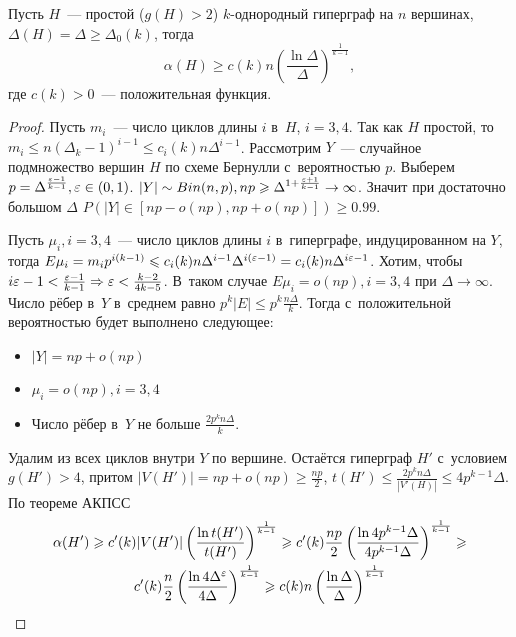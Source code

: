 \documentclass{article}
\begin{document}
\begin{theorem}
	Пусть $H$~--- простой ($g(H) > 2$) $k$-однородный гиперграф на $n$ вершинах,
	$\Delta(H) = \Delta \ge \Delta_0(k)$, тогда
	$$
		\alpha(H) \ge c(k) n\left( \frac{\ln \Delta}{\Delta} \right)^{
			\frac{1}{k-1}},
	$$
	где $c(k) > 0$~--- положительная функция.
\end{theorem}
\begin{proof}
	Пусть $m_i$~--- число циклов длины $i$ в~$H$, $i = 3, 4$. Так как $H$ простой,
	то $m_i \le n (\Delta_k-1)^{i-1} \le c_i(k) n \Delta^{i-1}$. Рассмотрим
	$Y$~--- случайное подмножество вершин $H$ по схеме Бернулли с~вероятностью
	$p$. Выберем $p = \Delta^{\frac{\varepsilon - 1}{k - 1}}, \varepsilon \in (0, 1)$. $|Y| \sim
	Bin(n, p), np \geqslant \Delta^{1+\frac{\varepsilon+1}{k-1}} \rightarrow \infty$. Значит
	при достаточно большом $\Delta$ $P\left(|Y| \in [np - o(np), np + o(np)]
	\right) \ge 0.99$.

	Пусть $\mu_i, i = 3,4$~--- число циклов длины $i$ в~гиперграфе, индуцированном
	на $Y$, тогда $E\mu_i = m_i p^{i(k-1)} \leqslant c_i(k) n \Delta^{i-1}
	\Delta^{i(\varepsilon - 1)} = c_i(k) n \Delta^{i\varepsilon - 1}$. Хотим, чтобы $i\varepsilon - 1
	< \frac{\varepsilon - 1}{k - 1} \Rightarrow \varepsilon < \frac{k-2}{4k-5}$. В~таком случае
	$E\mu_i = o(np), i=3,4$ при $\Delta \rightarrow \infty$. Число рёбер в~$Y$
	в~среднем равно $p^k|E| \le p^k \frac{n\Delta}{k}$. Тогда с~положительной
	вероятностью будет выполнено следующее:
	\begin{itemize}
		\item $|Y| = np + o(np)$
		\item $\mu_i = o(np), i=3,4$
		\item Число рёбер в~$Y$ не больше $\frac{2p^k n\Delta}{k}$.
	\end{itemize}

	Удалим из всех циклов внутри $Y$ по вершине. Остаётся гиперграф $H'$
	с~условием $g(H') > 4$, притом $|V(H')| = np + o(np) \ge \frac{np}{2}$, $t(H')
	\le \frac{2p^k n\Delta}{|V'(H)|} \le 4p^{k-1} \Delta$. По теореме АКПСС
	\begin{multline*}
		\alpha(H') \geqslant c'(k) |V(H')| \left(\frac{\ln t(H')}{t(H')}
		\right)^\frac{1}{k-1} \geqslant c'(k) \frac{np}{2} \left( \frac{\ln 4p^{k-1}
		\Delta}{4p^{k-1}\Delta} \right)^\frac{1}{k-1} \geqslant\\ c'(k) \frac{n}{2} \left(
		\frac{\ln 4\Delta^\varepsilon}{4\Delta}\right)^\frac{1}{k-1} \geqslant c(k) n \left(
		\frac{\ln \Delta}{\Delta}\right)^\frac{1}{k-1}
	\end{multline*}
\end{proof}
\end{document}
